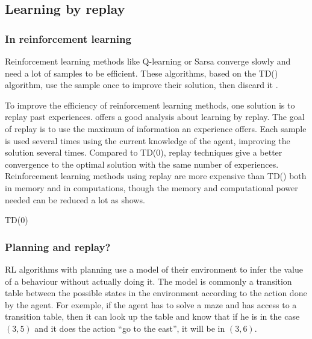 \documentclass[]{article}
\begin{document}
\subsection{Learning by replay}\label{learning-by-replay}

\subsubsection{In reinforcement learning}
\label{sub:In reinforcement learning}

Reinforcement learning methods like Q-learning or Sarsa converge slowly and need a lot of samples to be efficient. These algorithms, based on the TD(\textlambda) algorithm, use the sample once to improve their solution, then discard it \parencite{adam_experience_2012}.

To improve the efficiency of reinforcement learning methods, one solution is to replay past experiences. \textcite{vanseijen_deeper_2015} offers a good analysis about learning by replay. The goal of replay is to use the maximum of information an experience offers. Each sample is used several times using the current knowledge of the agent, improving the solution several times. Compared to TD(0), replay techniques give a better convergence to the optimal solution with the same number of experiences. Reinforcement learning methods using replay are more expensive than TD(\textlambda) both in memory and in computations, though the memory and computational power needed can be reduced a lot as \textcite{vanseijen_deeper_2015} shows.

\begin{algorithm}[H]
  \DontPrintSemicolon
  \SetAlgoNoLine
  \caption{TD(0)}

\end{algorithm}

\subsubsection{Planning and replay?}
\label{subs:Planning and replay}

RL algorithms with planning use a model of their environment to infer the value  of a behaviour without actually doing it. The model is commonly a transition table between the possible states in the environment according to the action done by the agent. For exemple, if the agent has to solve a maze and has access to a transition table, then it can look up the table and know that if he is in the case \((3, 5)\) and it does the action ``go to the east'', it will be in \((3, 6)\).
\end{document}
